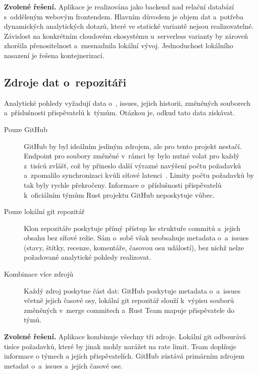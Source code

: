 \textbf{Zvolené řešení.} Aplikace je realizována jako backend nad relační databází s~odděleným webovým frontendem. Hlavním důvodem je objem dat a~potřeba dynamických analytických dotazů, které ve statické variantě nejsou realizovatelné. Závislost na konkrétním cloudovém ekosystému u~serverless varianty by zároveň zhoršila přenositelnost a~znesnadnila lokální vývoj. Jednoduchost lokálního nasazení je řešena kontejnerizací.

\subsection{Zdroje dat o~repozitáři}
\label{subsec:decisions:data_sources}

Analytické pohledy vyžadují data o~\PR, issues, jejich historii, změněných souborech a~příslušnosti přispěvatelů k~týmům. Otázkou je, odkud tato data získávat.

\begin{description}
  \item[Pouze GitHub \API]
    GitHub by byl ideálním jediným zdrojem, ale pro tento projekt nestačí. Endpoint pro soubory změněné v~rámci \PR by bylo nutné volat pro každý z~tisíců \PR zvlášť, což by přineslo další výrazné navýšení počtu požadavků a~zpomalilo synchronizaci kvůli síťové latenci~\cite{github_rest_api}. Limity počtu požadavků  by tak byly rychle překročeny. Informace o~příslušnosti přispěvatelů k~oficiálním týmům Rust projektu GitHub \API neposkytuje vůbec.

  \item[Pouze lokální git repozitář]
    Klon repozitáře poskytuje přímý přístup ke struktuře commitů a~jejich obsahu bez síťové režie. Sám o~sobě však neobsahuje metadata o~\PR a~issues (stavy, štítky, recenze, komentáře, časovou osu událostí), bez nichž nelze požadované analytické pohledy realizovat.

  \item[Kombinace více zdrojů]
    Každý zdroj poskytne část dat: GitHub \API poskytuje metadata o~\PR a~issues včetně jejich časové osy, lokální git repozitář slouží k~výpisu souborů změněných v~merge commitech a~Rust Team \API {} mapuje přispěvatele do týmů.
\end{description}

\textbf{Zvolené řešení.} Aplikace kombinuje všechny tři zdroje. Lokální git odbourává tisíce \API požadavků, které by jinak mohly narážet na rate limit. Team \API doplňuje informace o týmech a jejich přispěvatelích. GitHub \API zůstává primárním zdrojem metadat o~\PR a~issues a~jejich časové ose.

